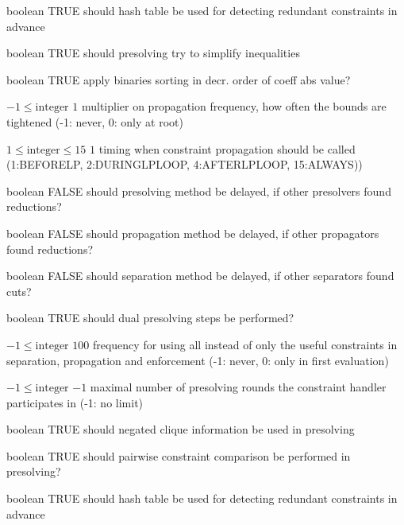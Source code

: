 %
{boolean}%
{TRUE}%
{should hash table be used for detecting redundant constraints in advance}%
{}

%
{boolean}%
{TRUE}%
{should presolving try to simplify inequalities}%
{}

%
{boolean}%
{TRUE}%
{apply binaries sorting in decr. order of coeff abs value?}%
{}

%
{$-1\leq\textrm{integer}$}%
{$1$}%
{multiplier on propagation frequency, how often the bounds are tightened (-1: never, 0: only at root)}%
{}

%
{$1\leq\textrm{integer}\leq15$}%
{$1$}%
{timing when constraint propagation should be called (1:BEFORELP, 2:DURINGLPLOOP, 4:AFTERLPLOOP, 15:ALWAYS))}%
{}

%
{boolean}%
{FALSE}%
{should presolving method be delayed, if other presolvers found reductions?}%
{}

%
{boolean}%
{FALSE}%
{should propagation method be delayed, if other propagators found reductions?}%
{}

%
{boolean}%
{FALSE}%
{should separation method be delayed, if other separators found cuts?}%
{}

%
{boolean}%
{TRUE}%
{should dual presolving steps be performed?}%
{}

%
{$-1\leq\textrm{integer}$}%
{$100$}%
{frequency for using all instead of only the useful constraints in separation, propagation and enforcement (-1: never, 0: only in first evaluation)}%
{}

%
{$-1\leq\textrm{integer}$}%
{$-1$}%
{maximal number of presolving rounds the constraint handler participates in (-1: no limit)}%
{}

%
{boolean}%
{TRUE}%
{should negated clique information be used in presolving}%
{}

%
{boolean}%
{TRUE}%
{should pairwise constraint comparison be performed in presolving?}%
{}

%
{boolean}%
{TRUE}%
{should hash table be used for detecting redundant constraints in advance}%
{}

